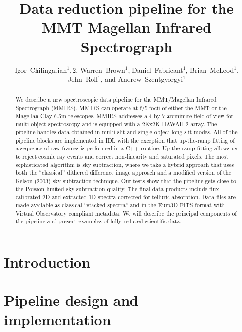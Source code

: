 \documentclass[11pt,twoside]{article}
\begin{document}
\title{Data reduction pipeline for the MMT Magellan Infrared Spectrograph
}
\author{Igor~Chilingarian$^1,2$, 
Warren~Brown$^1$, Daniel~Fabricant$^1$, 
Brian~McLeod$^1$, John~Roll$^1$,
and Andrew~Szentgyorgyi$^1$
}

\begin{abstract}
We describe a new spectroscopic data pipeline for the MMT/Magellan Infrared
Spectrograph (MMIRS).  MMIRS can operate at f/5 focii of either the MMT or
the Magellan Clay 6.5m telescopes.  MMIRS addresses a 4 by 7 arcminute field
of view for multi-object spectroscopy and is equipped with a 2Kx2K HAWAII-2
array.  The pipeline handles data obtained in multi-slit and single-object
long slit modes.  All of the pipeline blocks are implemented in IDL with the
exception that up-the-ramp fitting of a sequence of raw frames is performed
in a C++ routine.  Up-the-ramp fitting allows us to reject cosmic ray events
and correct non-linearity and saturated pixels.  The most sophisticated
algorithm is sky subtraction, where we take a hybrid approach that uses both
the ``classical'' dithered difference image approach and a modified version
of the Kelson (2003) sky subtraction technique.  Our tests show that the
pipeline gets close to the Poisson-limited sky subtraction quality.  The
final data products include flux-calibrated 2D and extracted 1D spectra
corrected for telluric absorption.  Data files are made available as
classical ``stacked spectra'' and in the Euro3D-FITS format with Virtual
Observatory compliant metadata.  We will describe the principal components
of the pipeline and present examples of fully reduced scientific data.
\end{abstract}

\section{Introduction}

\section{Pipeline design and implementation}

\end{document}

